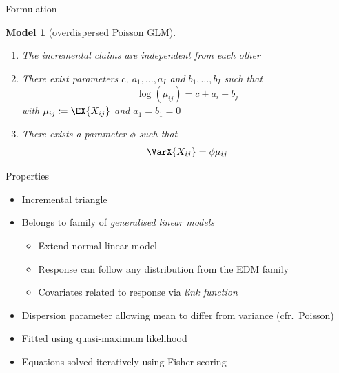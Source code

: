 \documentclass[tikz]{beamer}
\newtheorem{model}{Model}
\begin{document}
\begin{frame}{Formulation}
    \begin{model}[overdispersed Poisson GLM]
        \begin{enumerate}
            \item The incremental claims are independent from each other
            \item There exist parameters $c$, $a_1, \dots, a_I$ and $b_1, \dots, b_I$ such that
                  \begin{equation*}
                      \log(\mu_{ij}) = c + a_i + b_j
                  \end{equation*}
                  with $\mu_{ij} \coloneqq \EX{X_{ij}}$ and $a_1 = b_1 = 0$
            \item There exists a parameter $\phi$ such that
                  \begin{equation*}
                      \VarX{X_{ij}} = \phi \mu_{ij}
                  \end{equation*}
        \end{enumerate}
    \end{model}
\end{frame}

\begin{frame}{Properties}
    \begin{itemize}
        \item Incremental triangle
        \item Belongs to family of \emph{generalised linear models}
              \begin{itemize}
                  \item Extend normal linear model
                  \item Response can follow any distribution from the EDM family
                  \item Covariates related to response via \emph{link function}
              \end{itemize}
        \item Dispersion parameter allowing mean to differ from variance (cfr.\ Poisson)
        \item Fitted using quasi-maximum likelihood
        \item Equations solved iteratively using Fisher scoring
    \end{itemize}
\end{frame}
\end{document}
